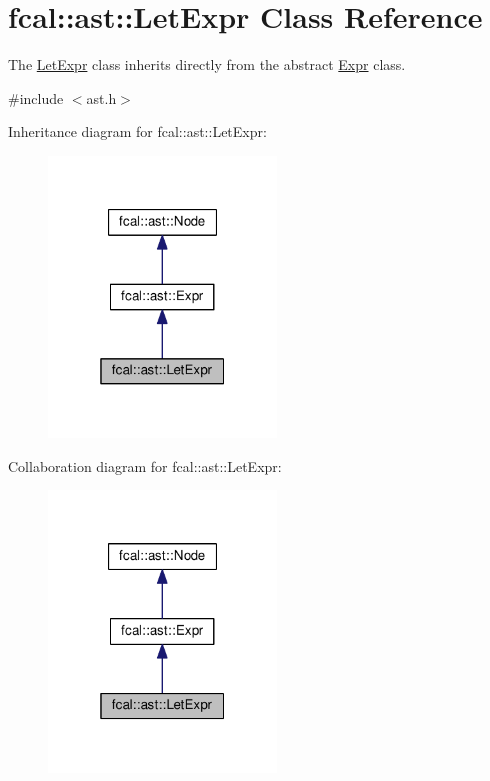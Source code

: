 \hypertarget{classfcal_1_1ast_1_1LetExpr}{}\section{fcal\+:\+:ast\+:\+:Let\+Expr Class Reference}
\label{classfcal_1_1ast_1_1LetExpr}


The \hyperlink{classfcal_1_1ast_1_1LetExpr}{Let\+Expr} class inherits directly from the abstract \hyperlink{classfcal_1_1ast_1_1Expr}{Expr} class.  




{\ttfamily \#include $<$ast.\+h$>$}



Inheritance diagram for fcal\+:\+:ast\+:\+:Let\+Expr\+:\nopagebreak
\begin{figure}[H]
\begin{center}
\leavevmode
\includegraphics[width=172pt]{classfcal_1_1ast_1_1LetExpr__inherit__graph}
\end{center}
\end{figure}


Collaboration diagram for fcal\+:\+:ast\+:\+:Let\+Expr\+:\nopagebreak
\begin{figure}[H]
\begin{center}
\leavevmode
\includegraphics[width=172pt]{classfcal_1_1ast_1_1LetExpr__coll__graph}
\end{center}
\end{figure}
